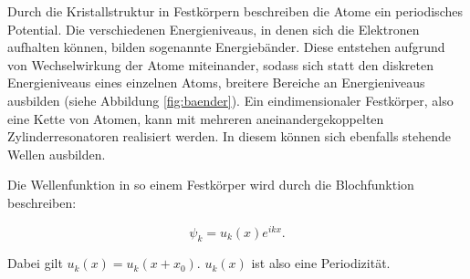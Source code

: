 Durch die Kristallstruktur in Festkörpern beschreiben die Atome ein periodisches Potential. Die verschiedenen Energieniveaus, in
denen sich die Elektronen aufhalten können, bilden sogenannte Energiebänder. Diese entstehen aufgrund von Wechselwirkung
der Atome miteinander, sodass sich statt den diskreten Energieniveaus eines einzelnen Atoms, breitere Bereiche an
Energieniveaus ausbilden (siehe Abbildung \ref{fig:baender}).
Ein eindimensionaler Festkörper, also eine Kette von Atomen, kann mit mehreren aneinandergekoppelten Zylinderresonatoren
realisiert werden. In diesem können sich ebenfalls stehende Wellen ausbilden.

Die Wellenfunktion in so einem Festkörper wird durch die Blochfunktion beschreiben:

\begin{equation}
  \psi_k = u_k(x)e^{ikx} .
\end{equation}

Dabei gilt $u_k(x) = u_k(x+x_0)$. $u_k(x)$ ist also eine Periodizität.
